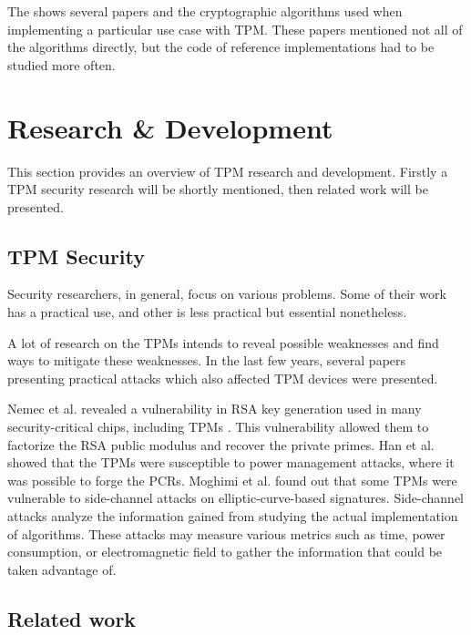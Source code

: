 The  shows several papers and the cryptographic algorithms used when implementing a particular use case with TPM. These papers mentioned not all of the algorithms directly, but the code of reference implementations had to be studied more often.

\section{Research \& Development}
This section provides an overview of TPM research and development. Firstly a TPM security research will be shortly mentioned, then related work will be presented.

\subsection{TPM Security}
Security researchers, in general, focus on various problems. Some of their work has a practical use, and other is less practical but essential nonetheless. 

A lot of research on the TPMs intends to reveal possible weaknesses and find ways to mitigate these weaknesses. In the last few years, several papers presenting practical attacks which also affected TPM devices were presented.

Nemec et al. revealed a vulnerability in RSA key generation used in many security-critical chips, including TPMs \cite{2017-ccs-nemec}. This vulnerability allowed them to factorize the RSA public modulus and recover the private primes. Han et al. \cite{han2018sleep} showed that the TPMs were susceptible to power management attacks, where it was possible to forge the PCRs. Moghimi et al. \cite{moghimi2020fail} found out that some TPMs were vulnerable to side-channel attacks on elliptic-curve-based signatures. Side-channel attacks analyze the information gained from studying the actual  implementation of algorithms. These attacks may measure various metrics such as time, power consumption, or electromagnetic field to gather the information that could be taken advantage of.




\subsection{Related work}

